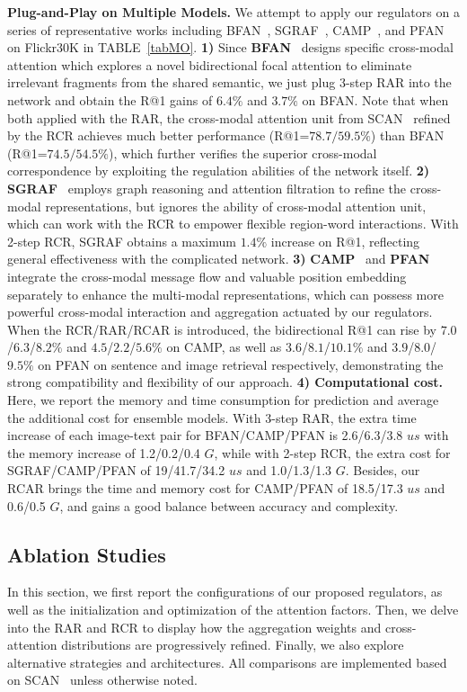 \documentclass[journal]{IEEEtran}\newcommand{\ignore}[1]{}
\begin{document}
\textbf{Plug-and-Play on Multiple Models.} 
We attempt to apply our regulators on a series of representative works including BFAN~\cite{BFAN}, SGRAF~\cite{SGRAF}, CAMP~\cite{CAMP}, and PFAN~\cite{PFAN} on Flickr30K in TABLE~\ref{tabMO}.
\textbf{1)} Since \textbf{BFAN}~\cite{BFAN} designs specific cross-modal attention which explores a novel bidirectional focal attention to eliminate irrelevant fragments from the shared semantic, we just plug 3-step RAR into the network and obtain the R@1 gains of $6.4\%$ and $3.7\%$ on BFAN. Note that when both applied with the RAR, the cross-modal attention unit from SCAN~\cite{SCAN} refined by the RCR achieves much better performance (R@1=$78.7/59.5\%$) than BFAN (R@1=$74.5/54.5\%$), which further verifies the superior cross-modal correspondence by exploiting the regulation abilities of the network itself.
\textbf{2)} \textbf{SGRAF}~\cite{SGRAF} employs graph reasoning and attention filtration to refine the cross-modal representations, but ignores the ability of cross-modal attention unit, which can work with the RCR to empower flexible region-word interactions. With 2-step RCR, SGRAF obtains a maximum $1.4\%$ increase on R@1, reflecting general effectiveness with the complicated network.
\textbf{3)} \textbf{CAMP}~\cite{CAMP} and \textbf{PFAN}~\cite{PFAN} integrate the cross-modal message flow and valuable position embedding separately to enhance the multi-modal representations, which can possess more powerful cross-modal interaction and aggregation actuated by our regulators. When the RCR/RAR/RCAR is introduced, the bidirectional R@1 can rise by $7.0$/$6.3$/$8.2\%$ and $4.5$/$2.2$/$5.6\%$ on CAMP, as well as $3.6$/$8.1$/$10.1\%$ and $3.9$/$8.0$/$9.5\%$ on PFAN on sentence and image retrieval respectively, demonstrating the strong compatibility and flexibility of our approach. 
\textbf{4) Computational cost.} Here, we report the memory and time consumption for prediction and average the additional cost for ensemble models. With 3-step RAR, the extra time increase of each image-text pair for BFAN/CAMP/PFAN is 2.6/6.3/3.8 $us$ with the memory increase of 1.2/0.2/0.4 $G$, while with 2-step RCR, the extra cost for SGRAF/CAMP/PFAN of 19/41.7/34.2 $us$ and 1.0/1.3/1.3 $G$. Besides, our RCAR brings the time and memory cost for CAMP/PFAN of 18.5/17.3 $us$ and 0.6/0.5 $G$, and gains a good balance between accuracy and complexity.

\subsection{Ablation Studies}
\label{secAS}
In this section, we first report the configurations of our proposed regulators, as well as the initialization and optimization of the attention factors. Then, we delve into the RAR and RCR to display how the aggregation weights and cross-attention distributions are progressively refined. Finally, we also explore alternative strategies and architectures. All comparisons are implemented based on SCAN~\cite{SCAN} unless otherwise noted.
\end{document}

